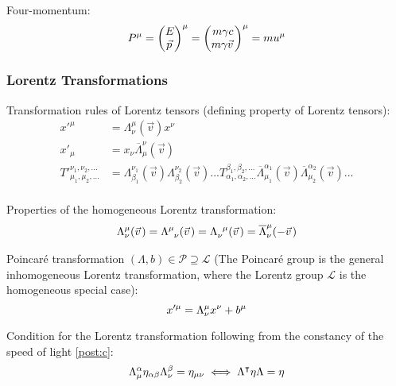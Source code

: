			\noindent
			Four-momentum:
			\begin{equation}
				P^\mu =
				\mqty(
				E \\ \vec{p}
				)^\mu
				= \mqty(
				m\gamma c \\ m\gamma\vec{v}
				)^\mu
				= m u^\mu
			\end{equation}

		\subsubsection{Lorentz Transformations}
			\noindent
			Transformation rules of Lorentz tensors (defining property of Lorentz tensors):
			\begin{equation}
				\begin{aligned}
					{x'}^\mu &= \Lambda^{\mu}_{\nu}(\vec{v}) x^\nu \\
					{x'}_\mu &=  x_\nu \overline{\Lambda}_\mu^{\nu}(\vec{v}) \\
					{T'}_{\mu_1,\mu_2,...}^{\nu_1,\nu_2,...} &=  \Lambda^{\nu_1}_{\beta_1}(\vec{v}) \Lambda^{\nu_2}_{\beta_2}(\vec{v}) ... T_{\alpha_1,\alpha_2,...}^{\beta_1,\beta_2,...} \overline{\Lambda}_{\mu_1}^{\alpha_1}(\vec{v}) \overline{\Lambda}_{\mu_2}^{\alpha_2}(\vec{v}) ... \\
				\end{aligned}
			\end{equation}

			\noindent
			Properties of the homogeneous Lorentz transformation:
			\begin{equation}
				\Lambda^{\mu}_{\nu}(\vec{v}) = \Lambda^{\mu}_{\phantom{\mu}\nu}(\vec{v}) = \Lambda^{\phantom{\nu}\mu}_{\nu}(\vec{v}) = \overline{\Lambda}^{\mu}_{\nu}(-\vec{v}) \\
			\end{equation}

			\noindent
			Poincaré transformation $(\Lambda, b) \in\mathcal{P} \supseteq \mathcal{L}$ (The Poincaré group is the general inhomogeneous Lorentz transformation, where the Lorentz group $\mathcal{L}$ is the homogeneous special case):
			\begin{equation}
				x'^\mu = \Lambda^\mu_{\nu} x^\nu + b^\mu \\
			\end{equation}

			\noindent
			Condition for the Lorentz transformation following from the constancy of the speed of light \ref{post:c}:
			\begin{equation}
				\Lambda^{\alpha}_{\mu} \eta_{\alpha\beta} \Lambda^{\beta}_{\nu} = \eta_{\mu\nu}
				\iff \Lambda^\intercal \eta \Lambda = \eta
			\end{equation}

